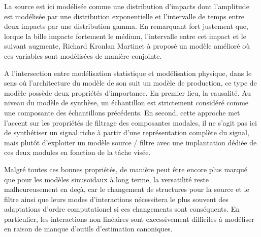 \begin{marginfigure}
  \scalebox{.6}{
  }
  \label{fig:modal}
\caption{}
\end{marginfigure}

La source est ici modélisée comme une distribution d'impacts dont l'amplitude est modélisée par une distribution exponentielle et l'intervalle de temps entre deux impacts par une distribution gamma. En remarquant fort justement que, lorque la bille impacte fortement le médium, l'intervalle entre cet impact et le suivant augmente, Richard Kronlan Martinet\cite{conan2014synthesis} à proposé un modèle amélioré où ces variables sont modélisées de manière conjointe.

A l'intersection entre modélisation statistique et modélisation physique, dans le sens où l'architecture du modèle de son suit un modèle de production, ce type de modèle possède deux propriétés d'importance. En premier lieu, la causalité. Au niveau du modèle de synthèse, un échantillon est strictement considéré comme une composante des échantillons précédents. En second, cette approche met l'accent sur les propriétés de filtrage des composantes modales, il ne s'agit pas ici de synthétiser un signal riche à partir d'une représentation complète du signal, mais plutôt d'exploiter un modèle source / filtre avec une implantation dédiée de ces deux modules en fonction de la tâche visée.


Malgré toutes ces bonnes propriétés, de manière peut être encore plus marqué que pour les modèles sinusoïdaux à long terme, la versatilité reste malheureusement en deçà, car le changement de structures pour la source et le filtre ainsi que leurs modes d'interactions nécessitera le plus souvent des adaptations d'ordre computationel si ces changements sont conséquents. En particulier, les interactions non linéaires sont excessivement difficiles à modéliser en raison de manque d'outils d'estimation canoniques.


